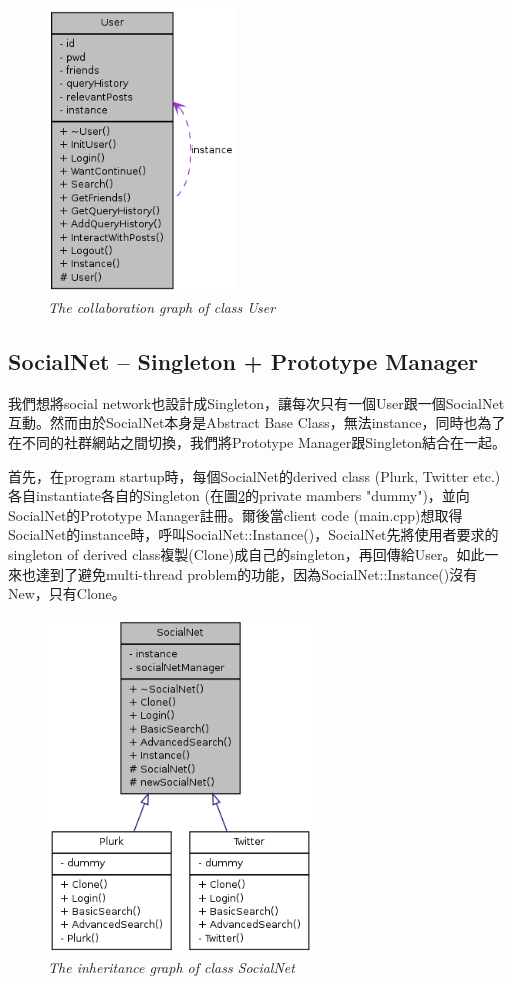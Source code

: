 \documentclass[12pt]{article}
\begin{document}
\begin{figure}[t]
\centering
\includegraphics[width=5cm]{classUser__coll__graph.png}
\caption{{\it The collaboration graph of class User}}
\label{fig:classDiagram}
\end{figure}

\subsection{SocialNet -- Singleton + Prototype Manager}

我們想將social network也設計成Singleton，讓每次只有一個User跟一個SocialNet互動。然而由於SocialNet本身是Abstract Base Class，無法instance，同時也為了在不同的社群網站之間切換，我們將Prototype Manager跟Singleton結合在一起。

首先，在program startup時，每個SocialNet的derived class (Plurk, Twitter etc.)各自instantiate各自的Singleton (在圖\ref{fig:SocialNet_inherit}的private mambers "dummy")，並向SocialNet的Prototype Manager註冊。爾後當client code (main.cpp)想取得SocialNet的instance時，呼叫SocialNet::Instance()，SocialNet先將使用者要求的singleton of derived class複製(Clone)成自己的singleton，再回傳給User。如此一來也達到了避免multi-thread problem的功能，因為SocialNet::Instance()沒有New，只有Clone。

\begin{figure}[t]
\centering
\includegraphics[width=7cm]{classSocialNet__inherit__graph.png}
\caption{{\it The inheritance graph of class SocialNet}}
\label{fig:SocialNet_inherit}
\end{figure}
\end{document}
